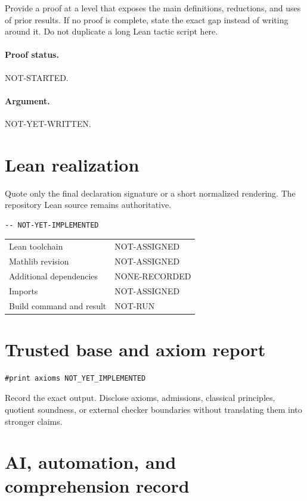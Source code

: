\documentclass[11pt]{article}
\begin{document}
Provide a proof at a level that exposes the main definitions, reductions, and uses of
prior results. If no proof is complete, state the exact gap instead of writing around it.
Do not duplicate a long Lean tactic script here.

\paragraph{Proof status.} NOT-STARTED.

\paragraph{Argument.} NOT-YET-WRITTEN.

\section{Lean realization}

Quote only the final declaration signature or a short normalized rendering.
The repository Lean source remains authoritative.

\begin{verbatim}
-- NOT-YET-IMPLEMENTED
\end{verbatim}

\begin{tabular}{@{}p{}p{}@{}}
\toprule
Lean toolchain & NOT-ASSIGNED \\
Mathlib revision & NOT-ASSIGNED \\
Additional dependencies & NONE-RECORDED \\
Imports & NOT-ASSIGNED \\
Build command and result & NOT-RUN \\
\bottomrule
\end{tabular}

\section{Trusted base and axiom report}

\begin{verbatim}
#print axioms NOT_YET_IMPLEMENTED
\end{verbatim}

Record the exact output. Disclose axioms, admissions, classical principles, quotient
soundness, or external checker boundaries without translating them into stronger claims.

\section{AI, automation, and comprehension record}
\end{document}
